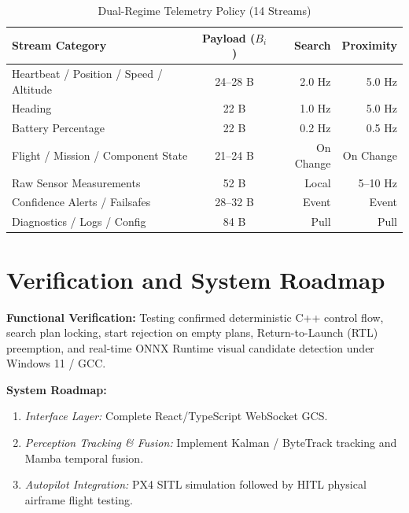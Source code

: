 \documentclass[conference]{IEEEtran}
\begin{document}
\begin{table}[htbp]
\caption{Dual-Regime Telemetry Policy (14 Streams)}
\label{tab:telemetry_policy}
\centering
\scriptsize
\begin{tabular*}{\columnwidth}{@{\extracolsep{\fill}}lcrr@{}}
\toprule
\textbf{Stream Category} & \textbf{Payload ($B_i$)} & \textbf{Search} & \textbf{Proximity} \\
\midrule
Heartbeat / Position / Speed / Altitude & 24--28 B & 2.0 Hz & 5.0 Hz \\
Heading & 22 B & 1.0 Hz & 5.0 Hz \\
Battery Percentage & 22 B & 0.2 Hz & 0.5 Hz \\
Flight / Mission / Component State & 21--24 B & On Change & On Change \\
Raw Sensor Measurements & 52 B & Local & 5--10 Hz \\
Confidence Alerts / Failsafes & 28--32 B & Event & Event \\
Diagnostics / Logs / Config & 84 B & Pull & Pull \\
\bottomrule
\end{tabular*}
\end{table}

\section{Verification and System Roadmap}
\textbf{Functional Verification:} Testing confirmed deterministic C++ control flow, search plan locking, start rejection on empty plans, Return-to-Launch (RTL) preemption, and real-time ONNX Runtime visual candidate detection under Windows 11 / GCC.

\textbf{System Roadmap:}
\begin{enumerate}
    \item \emph{Interface Layer:} Complete React/TypeScript WebSocket GCS.
    \item \emph{Perception Tracking \& Fusion:} Implement Kalman / ByteTrack tracking and Mamba temporal fusion.
    \item \emph{Autopilot Integration:} PX4 SITL simulation followed by HITL physical airframe flight testing.
\end{enumerate}
\end{document}

